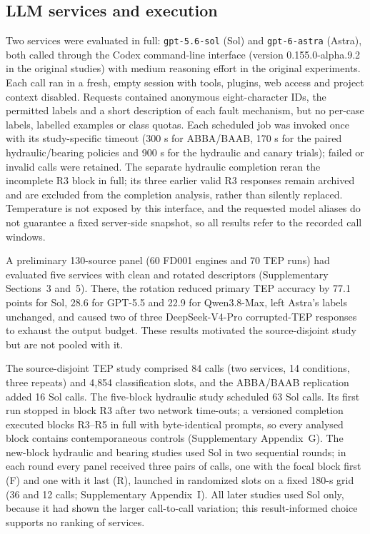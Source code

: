 \documentclass[11pt,a4paper]{article}
\begin{document}
\subsection{LLM services and execution}
Two services were evaluated in full: \texttt{gpt-5.6-sol} (Sol) and \texttt{gpt-6-astra} (Astra), both called through the Codex command-line interface (version 0.155.0-alpha.9.2 in the original studies) with medium reasoning effort in the original experiments. Each call ran in a fresh, empty session with tools, plugins, web access and project context disabled. Requests contained anonymous eight-character IDs, the permitted labels and a short description of each fault mechanism, but no per-case labels, labelled examples or class quotas. Each scheduled job was invoked once with its study-specific timeout (300 s for ABBA/BAAB, 170 s for the paired hydraulic/bearing policies and 900 s for the hydraulic and canary trials); failed or invalid calls were retained. The separate hydraulic completion reran the incomplete R3 block in full; its three earlier valid R3 responses remain archived and are excluded from the completion analysis, rather than silently replaced. Temperature is not exposed by this interface, and the requested model aliases do not guarantee a fixed server-side snapshot, so all results refer to the recorded call windows.

A preliminary 130-source panel (60 FD001 engines and 70 TEP runs) had evaluated five services with clean and rotated descriptors (Supplementary Sections~3 and~5). There, the rotation reduced primary TEP accuracy by 77.1 points for Sol, 28.6 for GPT-5.5 and 22.9 for Qwen3.8-Max, left Astra's labels unchanged, and caused two of three DeepSeek-V4-Pro corrupted-TEP responses to exhaust the output budget. These results motivated the source-disjoint study but are not pooled with it.

The source-disjoint TEP study comprised 84 calls (two services, 14 conditions, three repeats) and 4{,}854 classification slots, and the ABBA/BAAB replication added 16 Sol calls. The five-block hydraulic study scheduled 63 Sol calls. Its first run stopped in block R3 after two network time-outs; a versioned completion executed blocks R3--R5 in full with byte-identical prompts, so every analysed block contains contemporaneous controls (Supplementary Appendix~G). The new-block hydraulic and bearing studies used Sol in two sequential rounds; in each round every panel received three pairs of calls, one with the focal block first (F) and one with it last (R), launched in randomized slots on a fixed 180-s grid (36 and 12 calls; Supplementary Appendix~I). All later studies used Sol only, because it had shown the larger call-to-call variation; this result-informed choice supports no ranking of services.
\end{document}
